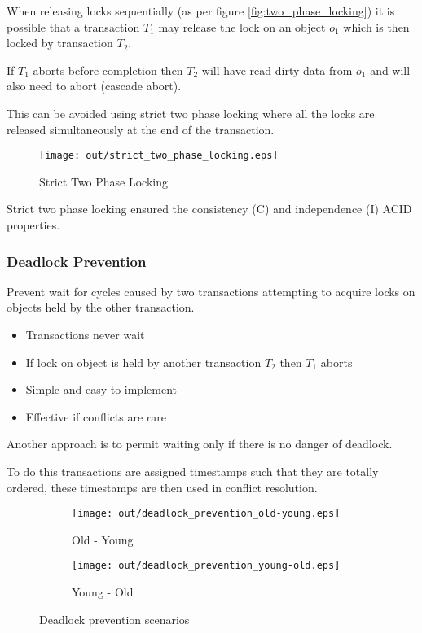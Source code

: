 \documentclass[a4paper]{article}
\begin{document}
When releasing locks sequentially (as per figure \ref{fig:two_phase_locking}) it
is possible that a transaction $T_{1}$ may release the lock on an object $o_{1}$
which is then locked by transaction $T_{2}$.

If $T_{1}$ aborts before completion then $T_{2}$ will have read dirty data from
$o_{1}$ and will also need to abort (cascade abort).

This can be avoided using strict two phase locking where all the locks are
released simultaneously at the end of the transaction.

\begin{figure}[h!]
  \centering
  \texttt{[image: out/strict\_two\_phase\_locking.eps]}
  \caption{Strict Two Phase Locking}
  \label{fig:strict_two_phase_locking}
\end{figure}
\FloatBarrier

Strict two phase locking ensured the consistency (C) and independence (I)
ACID properties.

\subsubsection{Deadlock Prevention}
\label{sec:deadlock_prevention}

Prevent wait for cycles caused by two transactions attempting to acquire locks
on objects held by the other transaction.


\begin{itemize}
  \item Transactions never wait
  \item If lock on object is held by another transaction $T_{2}$ then $T_{1}$
        aborts
  \item Simple and easy to implement
  \item Effective if conflicts are rare
\end{itemize}


Another approach is to permit waiting only if there is no danger of deadlock.

To do this transactions are assigned timestamps such that they are totally
ordered, these timestamps are then used in conflict resolution.

\begin{figure}[h]
  \centering
  \begin{subfigure}[b]{0.4\textwidth}
    \texttt{[image: out/deadlock\_prevention\_old-young.eps]}
    \caption{Old - Young}
    \label{fig:deadlock_prevention_old-young}
  \end{subfigure}
  \begin{subfigure}[b]{0.4\textwidth}
    \texttt{[image: out/deadlock\_prevention\_young-old.eps]}
    \caption{Young - Old}
    \label{fig:deadlock_prevention_young-old}
  \end{subfigure}
  \caption{Deadlock prevention scenarios}
  \label{fig:deadlock_prevention}
\end{figure}
\FloatBarrier
\end{document}
